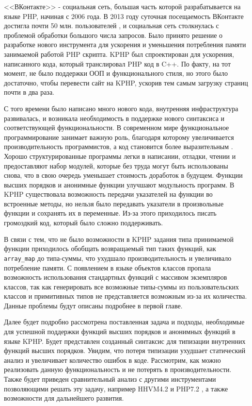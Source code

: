 \startprefacepage
<<ВКонтакте>> - социальная сеть, большая часть которой разрабатывается на языке PHP, начиная с 2006 года.
В 2013 году суточная посещаемость ВКонтакте достигла почти 50 млн. пользователей \cite{kphp-vk-2013}, и социальная сеть столкнулась с проблемой обработки большого числа запросов.
Было принято решение о разработке нового инструмента для ускорения и уменьшения потребления памяти занимаемой работой PHP скрипта.
KPHP был спроектирован для ускорения, написанного кода, который транслировал PHP код в C++.
По факту, на тот момент, не было поддержки ООП и функционального стиля, но этого было достаточно, чтобы перевести сайт на KPHP, ускорив тем самым загрузку страниц почти в два раза.

С того времени было написано много нового кода, внутренняя инфраструктура развивалась, и возникала необходимость в поддержке нового синтаксиса и соответствующей функциональности.
В современном мире функциональное программирование занимает важную роль, благодаря которому увеличивается производительность программистов, а код становится более выразительным \cite{fp-matters}.
Хорошо структурированные программы легки в написании, отладки, чтении и предоставляют набор модулей, которые без труда могут быть использованы снова, что в свою очередь уменьшает стоимость доработок в будущем.
Функции высших порядков и анонимные функции улучшают модульность программ.
В KPHP существовала возможность передачи указателей на функции во встроенные методы, но нельзя было передавать указатели в произвольные функции и сохранять их в переменные.
Из-за этого приходилось писать громоздкий код, который было сложно поддерживать.

В связи с тем, что не было возможности в KPHP задания типа принимаемой функции приходилось обобщать возвращаемый тип таких функций, как \verb|array_map| до типа-суммы, что ухудшало производительность и увеличивало потребление памяти.
С появлением в языке объектов классов пропала возможность использования стандартных функций с массивом экземпляров классов, так как генерировать все возможные типы-суммы из пользовательских классов и примитивных типов не представляется возможным из-за их количества.
Данные проблемы будут описаны подробнее в первой главе.

Далее будет подробно рассмотрена поставленная задача и подходы, необходимые для успешной поддержки функций высших порядков и анонимных функций в языке KPHP.
Будет представлен созданный синтаксис для типизации внутренних функций высших порядков.
Увидим, что потеря типизации ухудшает статический анализ и увеличивает количество ошибок в коде.
Рассмотрим, как можно реализовать данную функциональность и не потерять в производительности.
Также будет приведен сравнительный анализ с другими инструментами позволяющими решать эту задачу, например HHVM4.2 \cite{hhvm} и PHP7.2 \cite{php7}, а также возможности для дальнейшего развития.
